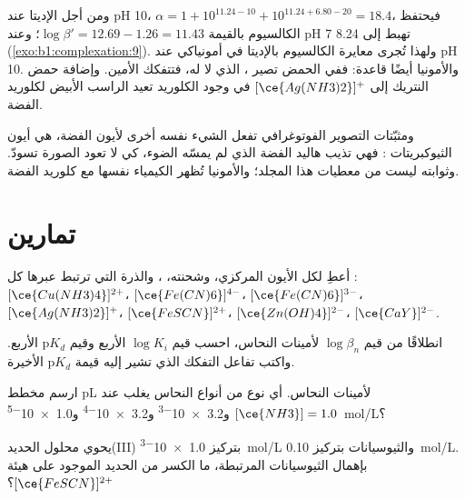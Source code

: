 ومن أجل الإديتا عند pH 10، $\alpha = 1 + 10^{11.24 - 10} + 10^{11.24 + 6.80 - 20}
= 18.4$، فيحتفظ  الكالسيوم بالقيمة $\log\beta' = 12.69 - 1.26 = 11.43$؛
وعند pH 7 تهبط إلى 8.24 (\cref{exo:b1:complexation:9}). ولهذا
تُجرى معايرة الكالسيوم بالإديتا في  أمونياكي عند pH 10.
والأمونيا أيضًا قاعدة: ففي الحمض تصير ، الذي لا 
له، فتتفكك  الأمين. وإضافة حمض النتريك إلى
$[\ce{Ag(NH3)2}]^{+}$ في وجود الكلوريد تعيد الراسب
الأبيض لكلوريد الفضة.

ومثبّتات التصوير الفوتوغرافي تفعل الشيء نفسه  أخرى لأيون الفضة،
هي أيون الثيوكبريتات : فهي تذيب هاليد الفضة الذي لم
يمسّه الضوء، كي لا تعود الصورة تسودّ. وثوابته
ليست من معطيات هذا المجلد؛ والأمونيا تُظهر الكيمياء نفسها
مع كلوريد الفضة.

\section{تمارين}

\begin{exercise}[$\star$]\label{exo:b1:complexation:1}
أعطِ لكل  الأيون المركزي، وشحنته، ،
والذرة التي ترتبط عبرها كل : $[\ce{Cu(NH3)4}]^{2+}$،
$[\ce{Fe(CN)6}]^{4-}$، $[\ce{Fe(CN)6}]^{3-}$، $[\ce{Ag(NH3)2}]^{+}$،
$[\ce{FeSCN}]^{2+}$، $[\ce{Zn(OH)4}]^{2-}$، $[\ce{CaY}]^{2-}$.
\end{exercise}

\begin{exercise}[$\star$]\label{exo:b1:complexation:2}
انطلاقًا من قيم $\log\beta_n$ لأمينات النحاس، احسب قيم $\log K_i$ الأربع
وقيم $\mathrm{p}K_d$ الأربع. واكتب تفاعل التفكك الذي
تشير إليه قيمة $\mathrm{p}K_d$ الأخيرة.
\end{exercise}

\begin{exercise}[$\star$]\label{exo:b1:complexation:3}
ارسم مخطط pL لأمينات النحاس. أي نوع من أنواع النحاس
يغلب عند $[\ce{NH3}] = 1.0$ و\num{3.2e-3} و\num{3.2e-4}
و\qty{1.0e-5}{mol/L}؟
\end{exercise}

\begin{exercise}[$\star$]\label{exo:b1:complexation:4}
يحوي محلول الحديد(III) بتركيز \qty{1.0e-3}{mol/L} والثيوسيانات بتركيز
\qty{0.10}{mol/L}. بإهمال الثيوسيانات المرتبطة، ما الكسر من
الحديد الموجود على هيئة $[\ce{FeSCN}]^{2+}$؟
\end{exercise}

